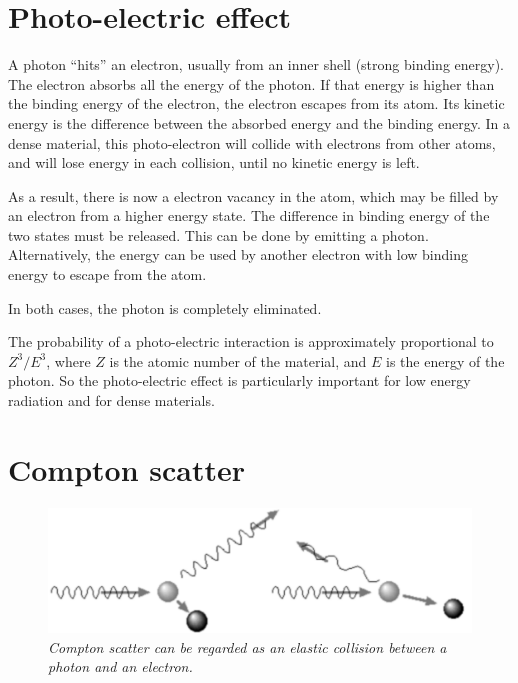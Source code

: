 \section{Photo-electric effect}
A photon ``hits'' an electron, usually from an inner shell (strong
binding energy). The electron absorbs all the energy of the photon. If
that energy is higher than the binding energy of the electron, the
electron escapes from its atom. Its kinetic energy is the difference
between the absorbed energy and the binding energy. In a dense
material, this photo-electron will collide with electrons from other
atoms, and will lose energy in each collision, until no kinetic energy
is left.

As a result, there is now a electron vacancy in the atom, which may be filled
by an electron from a higher energy state. The difference in binding energy
of the two states must be released. This can be done by emitting a photon.
Alternatively, the energy can be used by another electron with low binding
energy to escape from the atom.

In both cases, the photon is completely eliminated.

The probability of a photo-electric interaction is approximately proportional
to $Z^3 / E^3$, where $Z$ is the atomic number of the material, and $E$ is the
energy of the photon. So the photo-electric effect is particularly important for
low energy radiation and for dense materials.

\section{Compton scatter \label{sec:compton_scatter}}
\begin{figure}[tb]
\centering
\includegraphics[width=\figone]{figs/fig_compton_scatter.pdf}
\caption{\label{fig:compton_scatter} \emph{Compton scatter can be regarded as
an elastic collision between a photon and an electron.}}
\end{figure}

